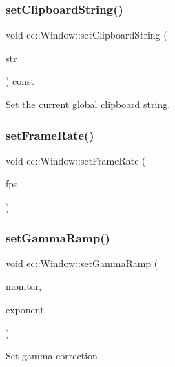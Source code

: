 \subsubsection{\texorpdfstring{set\+Clipboard\+String()}{setClipboardString()}}
{\footnotesize\ttfamily void ec\+::\+Window\+::set\+Clipboard\+String (\begin{DoxyParamCaption}\item[{const char $\ast$}]{str }\end{DoxyParamCaption}) const}

Set the current global clipboard string. \mbox{\label{classec_1_1_window_a6acc36f2c069b5e38f522953ca52ce9f}} 
\subsubsection{\texorpdfstring{set\+Frame\+Rate()}{setFrameRate()}}
{\footnotesize\ttfamily void ec\+::\+Window\+::set\+Frame\+Rate (\begin{DoxyParamCaption}\item[{double}]{fps }\end{DoxyParamCaption})\hspace{0.3cm}{\ttfamily [virtual]}}

\mbox{\label{classec_1_1_window_a53def2c77bb150fade5085d9dcfdb1e1}} 
\subsubsection{\texorpdfstring{set\+Gamma\+Ramp()}{setGammaRamp()}\hspace{0.1cm}{\footnotesize\ttfamily [1/2]}}
{\footnotesize\ttfamily void ec\+::\+Window\+::set\+Gamma\+Ramp (\begin{DoxyParamCaption}\item[{G\+L\+F\+Wmonitor $\ast$}]{monitor,  }\item[{float}]{exponent }\end{DoxyParamCaption})\hspace{0.3cm}{\ttfamily [static]}}

Set gamma correction. \mbox{\label{classec_1_1_window_aa23ab7022526a507f9a26c673f62d270}} 
